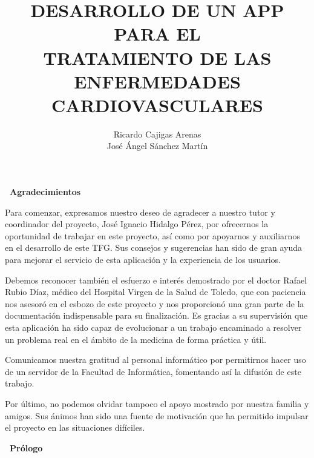 \documentclass[11pt,spanish,
		listoftables,listoffigures]
		{tfgplantilla}
\title{\MakeUppercase{Desarrollo de un app para el} \\
         \MakeUppercase{tratamiento de las Enfermedades Cardiovasculares}}
\author{Ricardo Cajigas Arenas \\ José Ángel Sánchez Martín}
\begin{document}


\setcounter{page}{1}
\cleardoublepage
{\par\hfill \sffamily\bfseries\Huge\ Agradecimientos}

Para comenzar, expresamos nuestro deseo de agradecer a nuestro tutor y coordinador del proyecto, José Ignacio Hidalgo Pérez, por ofrecernos la oportunidad de trabajar en este proyecto, así como por apoyarnos y auxiliarnos en el desarrollo de este TFG. Sus consejos y sugerencias han sido de gran ayuda para mejorar el servicio de esta aplicación y la experiencia de los usuarios.

Debemos reconocer también el esfuerzo e interés demostrado por el doctor Rafael Rubio Díaz, médico del Hospital Virgen de la Salud de Toledo, que con paciencia nos asesoró en el esbozo de este proyecto y nos proporcionó una gran parte de la documentación indispensable para su finalización. Es gracias a su supervisión que esta aplicación ha sido capaz de evolucionar a un trabajo encaminado a resolver un problema real en el ámbito de la medicina de forma práctica y útil.

Comunicamos nuestra gratitud al personal informático por permitirnos hacer uso de un servidor de la Facultad de Informática, fomentando así la difusión de este trabajo.

Por último, no podemos olvidar tampoco el apoyo mostrado por nuestra familia y amigos. Sus ánimos han sido una fuente de motivación que ha permitido impulsar el proyecto en las situaciones difíciles. 

\cleardoublepage
{\par\hfill \sffamily\bfseries\Huge\ Prólogo}
\end{document}
